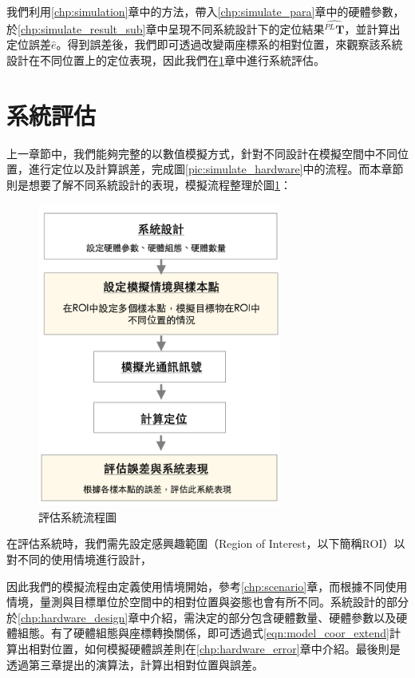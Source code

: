 我們利用\ref{chp:simulation}章中的方法，帶入\ref{chp:simulate_para}章中的硬體參數，於\ref{chp:simulate_result_sub}章中呈現不同系統設計下的定位結果$\hat{^{PL}\boldsymbol{T}}$，並計算出定位誤差$\hat{e}$。得到誤差後，我們即可透過改變兩座標系的相對位置，來觀察該系統設計在不同位置上的定位表現，因此我們在\ref{chp:system_evaluate}章中進行系統評估。






\section{系統評估}
\label{chp:system_evaluate}

上一章節中，我們能夠完整的以數值模擬方式，針對不同設計在模擬空間中不同位置，進行定位以及計算誤差，完成圖\ref{pic:simulate_hardware}中的流程。而本章節則是想要了解不同系統設計的表現，模擬流程整理於圖\ref{pic:evaluate_flow}：


\begin{figure}[ht]
    \centering
    \includegraphics[width=8cm]{ch4pic/evaluate_flow.png}
    \caption{評估系統流程圖}
    \label{pic:evaluate_flow}
\end{figure}

在評估系統時，我們需先設定感興趣範圍（Region of Interest，以下簡稱ROI）以對不同的使用情境進行設計，




因此我們的模擬流程由定義使用情境開始，參考\ref{chp:scenario}章，而根據不同使用情境，量測與目標單位於空間中的相對位置與姿態也會有所不同。系統設計的部分於\ref{chp:hardware_design}章中介紹，需決定的部分包含硬體數量、硬體參數以及硬體組態。有了硬體組態與座標轉換關係，即可透過式\ref{eqn:model_coor_extend}計算出相對位置，如何模擬硬體誤差則在\ref{chp:hardware_error}章中介紹。最後則是透過第三章提出的演算法，計算出相對位置與誤差。

